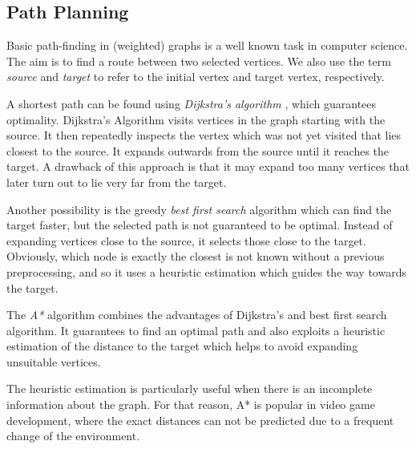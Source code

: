 \subsection{Path Planning}

Basic path-finding in (weighted) graphs is a well known task in computer science. The aim 
is to find a route between two selected vertices. We also use the term \emph{source} and
\emph{target} to refer to the initial vertex and target vertex, respectively.


A shortest path can be found using \emph{Dijkstra's algorithm} \cite{dijkstra59}, which guarantees optimality.
Dijkstra’s Algorithm visits vertices in the graph starting with the source. 
It then repeatedly inspects the vertex which was not yet visited that lies closest to the source. 
It expands outwards from the source until it reaches the target. 
A drawback of this approach is that it may expand too many vertices that later turn out to lie very far from the target.


Another possibility is the greedy \emph{best first search} algorithm which can find the target faster, but the selected path is not guaranteed to be optimal.
Instead of expanding vertices close to the source, it selects those close to the target.
Obviously, which node is exactly the closest is not known without a previous preprocessing, and so it uses a heuristic estimation which guides the way towards the target.


The \emph{A*} algorithm combines the advantages of Dijkstra's and best first search algorithm.
It guarantees to find an optimal path and also exploits a heuristic estimation of the distance to the target which helps to avoid expanding unsuitable vertices.

The heuristic estimation is particularly useful when there is an incomplete information about the graph.
For that reason, A* is popular in video game development, where the exact distances can not be predicted due to a frequent change of the environment. 

